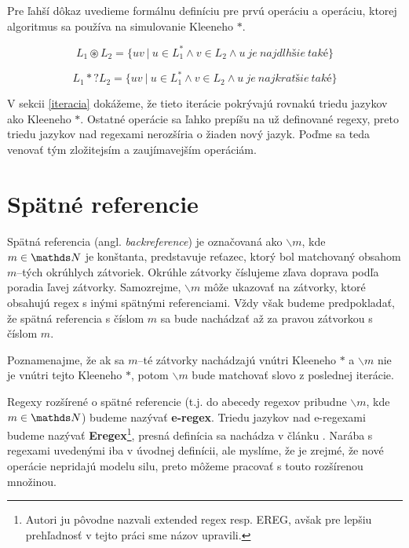 Pre ľahší dôkaz uvedieme formálnu definíciu pre prvú operáciu a operáciu, ktorej algoritmus sa používa na simulovanie Kleeneho $*$.

\begin{df}
$$ L_{1} \circledast L_{2} = \lbrace uv ~|~ u \in L_1^* \land v \in L_2 \land u~je~najdlhšie~také \rbrace$$
\end{df}

\begin{df}
$$ L_{1} *? L_{2} = \lbrace uv ~|~ u \in L_1^* \land v \in L_2 \land u~je~najkratšie~také \rbrace $$
\end{df}

V sekcii \ref{iteracia} dokážeme, že tieto iterácie pokrývajú rovnakú triedu jazykov ako Kleeneho $*$. Ostatné operácie sa ľahko prepíšu na už definované regexy, preto triedu jazykov nad regexami nerozšíria o žiaden nový jazyk. Poďme sa teda venovať tým zložitejsím a zaujímavejším operáciám.

\section{Spätné referencie}\label{chap:backref1}

Spätná referencia (angl. \textit{backreference}) je označovaná ako $ \backslash m $, kde $m \in \N$ je kon\-štan\-ta, predstavuje reťazec, ktorý bol matchovaný obsahom $m$--tých okrúhlych zátvoriek. Okrúhle zátvorky číslujeme zľava doprava podľa poradia ľavej zátvorky. Samozrejme, $\backslash m$ môže ukazovať na zátvorky, ktoré obsahujú regex s inými spätnými referenciami. Vždy však budeme predpokladať, že spätná referencia s číslom $m$ sa bude nachádzať až za pravou zátvorkou s číslom $m$.

Poznamenajme, že ak sa $m$--té zátvorky nachádzajú vnútri Kleeneho $*$ a $\backslash m$ nie je vnútri tejto Kleeneho $*$, potom $\backslash m$ bude matchovať slovo z poslednej iterácie.

Regexy rozšírené o spätné referencie (t.j. do abecedy regexov pribudne $\backslash m$, kde $m \in \N$) budeme nazývať \textbf{e-regex}. Triedu jazykov nad e-regexami budeme nazývať \textbf{Eregex}\footnote{Autori ju pôvodne nazvali extended regex resp. EREG, avšak pre lepšiu prehľadnosť v tejto práci sme názov upravili.}, presná definícia sa nachádza v článku \cite{ExtendedRegexPower}.  Narába s regexami uvedenými iba v úvodnej definícii, ale myslíme, že je zrejmé, že nové operácie nepridajú modelu silu, preto môžeme pracovať s touto rozšírenou množinou.

